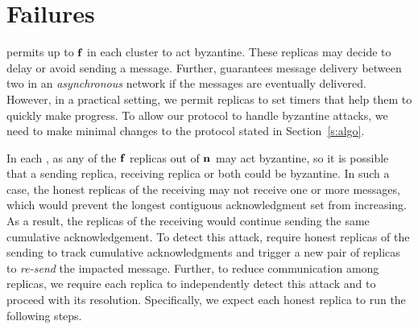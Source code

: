 \section{Failures}
\Scrooge{} permits up to $\textbf{f}_{}$ in each cluster to act byzantine.
These replicas may decide to delay or avoid sending a message. 
Further, \Scrooge{} guarantees message delivery between two  in an 
{\em asynchronous} network if the messages are eventually delivered.
However, in a practical setting, we permit replicas to set timers that help them to quickly make progress.
To allow our \Scrooge{} protocol to handle byzantine attacks, 
we need to make minimal changes to the protocol stated in Section~\ref{s:algo}.

In each \RSM{}, as any of the $\textbf{f}_{}$ replicas out of $\textbf{n}_{}$ may act byzantine, 
so it is possible that a sending replica, receiving replica or both could be byzantine. 
In such a case, the honest replicas of the receiving \RSM{} may not receive one or more messages, 
which would prevent the longest contiguous acknowledgment set from increasing.
As a result, the replicas of the receiving \RSM{}  
would continue sending the same cumulative acknowledgement.
To detect this attack, \Scrooge{} require honest replicas of the sending \RSM{} to 
track cumulative acknowledgments and trigger a new pair of replicas to {\em re-send} the impacted message.
Further, to reduce communication among replicas, we require each replica to independently 
detect this attack and to proceed with its resolution.
Specifically, we expect each honest replica to run the following steps.


